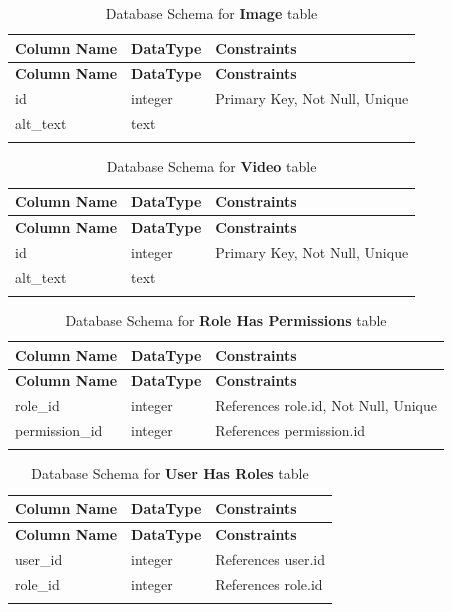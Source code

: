 \documentclass[12pt]{report}
\begin{document}
\begin{longtable}[H]{|l|l|p{6.5cm}||}
	\hline
	\textbf{Column Name} & \textbf{DataType} & \textbf{Constraints}          \\
	\hline
	\endfirsthead
	\hline
	\textbf{Column Name} & \textbf{DataType} & \textbf{Constraints}          \\
	\hline
	\endhead
	id                   & integer           & Primary Key, Not Null, Unique \\
	\hline
	alt\_text            & text              &                               \\
	\hline
	\hline
	\caption{Database Schema for \textbf{Image} table}\label{tab:tableImage}
\end{longtable}

\begin{longtable}[H]{|l|l|p{6.5cm}||}
	\hline
	\textbf{Column Name} & \textbf{DataType} & \textbf{Constraints}          \\
	\hline
	\endfirsthead
	\hline
	\textbf{Column Name} & \textbf{DataType} & \textbf{Constraints}          \\
	\hline
	\endhead
	id                   & integer           & Primary Key, Not Null, Unique \\
	\hline
	alt\_text            & text              &                               \\
	\hline
	\hline
	\caption{Database Schema for \textbf{Video} table}\label{tab:tableVideo}
\end{longtable}

\begin{longtable}[H]{|l|l|p{6.5cm}||}
	\hline
	\textbf{Column Name} & \textbf{DataType} & \textbf{Constraints}                 \\
	\hline
	\endfirsthead
	\hline
	\textbf{Column Name} & \textbf{DataType} & \textbf{Constraints}                 \\
	\hline
	\endhead
	role\_id             & integer           & References role.id, Not Null, Unique \\
	\hline
	permission\_id       & integer           & References permission.id             \\
	\hline
	\hline
	\caption{Database Schema for \textbf{Role Has Permissions} table}\label{tab:tableRoleHasPermissions}
\end{longtable}

\begin{longtable}[H]{|l|l|p{6.5cm}||}
	\hline
	\textbf{Column Name} & \textbf{DataType} & \textbf{Constraints} \\
	\hline
	\endfirsthead
	\hline
	\textbf{Column Name} & \textbf{DataType} & \textbf{Constraints} \\
	\hline
	\endhead
	user\_id             & integer           & References user.id   \\
	\hline
	role\_id             & integer           & References role.id   \\
	\hline
	\hline
	\caption{Database Schema for \textbf{User Has Roles} table}\label{tab:tableUserHasRoles}
\end{longtable}
\end{document}
